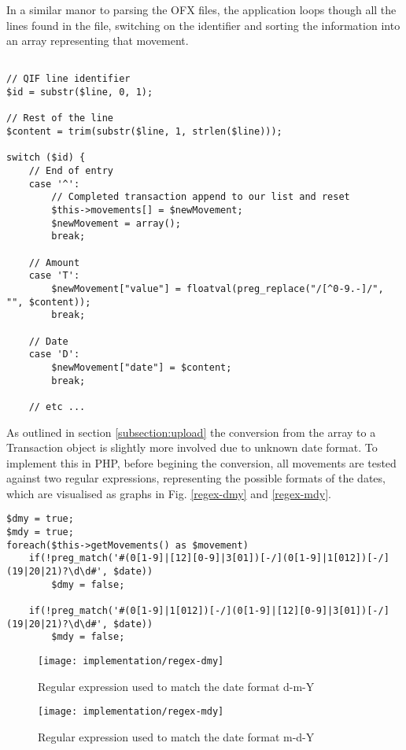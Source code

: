 In a similar manor to parsing the OFX files, the application loops though all the lines found in the file, switching on the identifier and sorting the information into an array representing that movement. 

\lstset{style=phpcolor}
\begin{lstlisting}

// QIF line identifier
$id = substr($line, 0, 1);

// Rest of the line
$content = trim(substr($line, 1, strlen($line)));

switch ($id) {
	// End of entry
	case '^':
		// Completed transaction append to our list and reset
		$this->movements[] = $newMovement;
		$newMovement = array();
		break;
		
	// Amount
	case 'T':
		$newMovement["value"] = floatval(preg_replace("/[^0-9.-]/", "", $content));
		break;
		
	// Date
	case 'D':
		$newMovement["date"] = $content;
		break;
		
	// etc ...
\end{lstlisting}

As outlined in section \ref{subsection:upload} the conversion from the array to a Transaction object is slightly more involved due to unknown date format. To implement this in PHP, before begining the conversion, all movements are tested against two regular expressions, representing the possible formats of the dates, which are visualised as graphs in Fig. \ref{regex-dmy} and \ref{regex-mdy}. 

\begin{lstlisting}
$dmy = true;
$mdy = true;
foreach($this->getMovements() as $movement)
	if(!preg_match('#(0[1-9]|[12][0-9]|3[01])[-/](0[1-9]|1[012])[-/](19|20|21)?\d\d#', $date))
		$dmy = false;
	
	if(!preg_match('#(0[1-9]|1[012])[-/](0[1-9]|[12][0-9]|3[01])[-/](19|20|21)?\d\d#', $date))
		$mdy = false;
\end{lstlisting}

\begin{figure}[h]
    \centering
    \texttt{[image: implementation/regex-dmy]}
    \caption{Regular expression used to match the date format d-m-Y}
    \label{fig:regex-dmy}
\end{figure}

\begin{figure}[h]
    \centering
    \texttt{[image: implementation/regex-mdy]}
    \caption{Regular expression used to match the date format m-d-Y}
    \label{fig:regex-mdy}
\end{figure}

